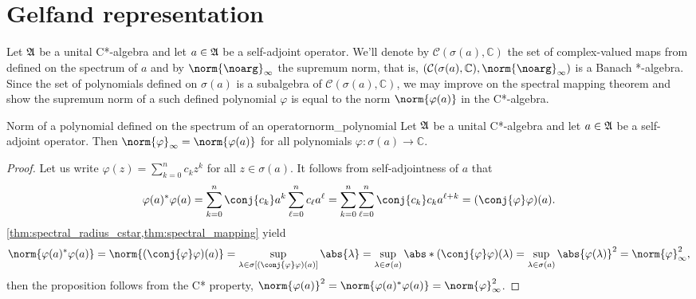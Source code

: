 \section{Gelfand representation}
Let \(\mathfrak{A}\) be a unital C*-algebra and let \(a \in \mathfrak{A}\) be a self-adjoint operator. We'll denote by \(\mathcal{C}(\sigma(a), \mathbb{C})\) the set of \todo[continuous] complex-valued maps from defined on the spectrum of \(a\) and by \(\norm{\noarg}_{\infty}\) the supremum norm, that is, \(\left(\mathcal{C}(\sigma(a), \mathbb{C}), \norm{\noarg}_{\infty}\right)\) is a Banach *-algebra. Since the set of polynomials defined on \(\sigma(a)\) is a subalgebra of \(\mathcal{C}(\sigma(a), \mathbb{C})\), we may improve on the spectral mapping theorem and show the supremum norm of a such defined polynomial \(\varphi\) is equal to the norm \(\norm{\varphi(a)}\) in the C*-algebra.
\begin{proposition}{Norm of a polynomial defined on the spectrum of an operator}{norm_polynomial}
    Let \(\mathfrak{A}\) be a unital C*-algebra and let \(a \in \mathfrak{A}\) be a self-adjoint operator. Then \(\norm{\varphi}_\infty = \norm{\varphi(a)}\) for all polynomials \(\varphi : \sigma(a) \to \mathbb{C}\).
\end{proposition}
\begin{proof}
    Let us write \(\varphi(z) = \sum_{k = 0}^{n} c_k z^k\) for all \(z \in \sigma(a)\). It follows from self-adjointness of \(a\) that
    \begin{equation*}
        \varphi(a)^*\varphi(a) = \sum_{k=0}^n \conj{c_k} a^k \sum_{\ell = 0}^n c_{\ell} a^\ell = \sum_{k = 0}^n \sum_{\ell = 0}^n \conj{c_k} c_k a^{\ell + k} = (\conj{\varphi}\varphi)(a).
    \end{equation*}
    \cref{thm:spectral_radius_cstar,thm:spectral_mapping} yield
    \begin{equation*}
        \norm{\varphi(a)^*\varphi(a)} = \norm{(\conj{\varphi}\varphi)(a)} = \sup_{\lambda \in \sigma\left[(\conj{\varphi}\varphi)(a)\right]}{\abs{\lambda}} = \sup_{\lambda \in \sigma(a)}{\abs*{(\conj{\varphi}\varphi)(\lambda)}} = \sup_{\lambda\in \sigma(a)}{\abs{\varphi(\lambda)}^2} = \norm{\varphi}_{\infty}^2,
    \end{equation*}
    then the proposition follows from the C* property, \(\norm{\varphi(a)}^2 = \norm{\varphi(a)^*\varphi(a)} = \norm{\varphi}_{\infty}^2\).
\end{proof}

